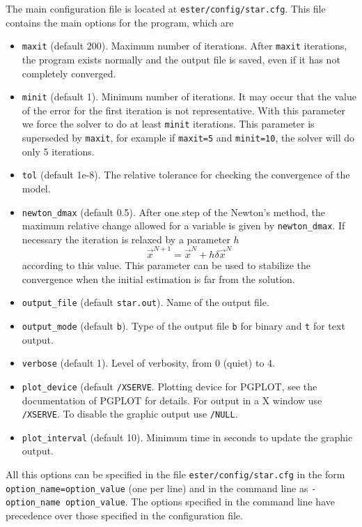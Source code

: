 The main configuration file is located at {\tt ester/config/star.cfg}.
This file contains the main options for the program, which are
\begin{itemize}
\item {\tt maxit} (default 200).
Maximum number of iterations. After {\tt maxit} iterations, the program
exists normally and the output file is saved, even if it has not completely converged.
\item {\tt minit} (default 1).
Minimum number of iterations. It may occur that the value of the error
for the first iteration is not representative. With this parameter we force the solver to
do at least {\tt minit} iterations. This parameter is superseded by {\tt maxit}, for example
if {\tt maxit=5} and {\tt minit=10}, the solver will do only 5 iterations.
\item {\tt tol} (default 1e-8). 
The relative tolerance for checking the convergence of the model.
\item {\tt newton\_dmax} (default 0.5).
After one step of the Newton's method, the maximum relative change
allowed for a variable is given by {\tt newton\_dmax}. If necessary the iteration is relaxed
by a parameter $h$
$$\vec x^{N+1}=\vec x^N+h \delta\vec x^N$$
according to this value.
This parameter can be used to stabilize the convergence when the initial estimation is far
from the solution.
\item {\tt output\_file} (default {\tt star.out}). Name of the output file.
\item {\tt output\_mode} (default {\tt b}). Type of the output file {\tt b} for binary
and {\tt t} for text output.
\item {\tt verbose} (default 1). Level of verbosity, from 0 (quiet) to 4.
\item {\tt plot\_device} (default {\tt /XSERVE}. Plotting device for PGPLOT, 
see the documentation of PGPLOT for details. For output in a X window use {\tt /XSERVE}.
To disable the graphic output use {\tt /NULL}.
\item {\tt plot\_interval} (default 10). Minimum time in seconds to update the graphic output.
\end{itemize}
All this options can be specified in the file {\tt ester/config/star.cfg} in the form
{\tt option\_name=option\_value} (one per line) and in the command line as 
{\tt -option\_name option\_value}. The options specified in the command line have precedence
over those specified in the configuration file. 

